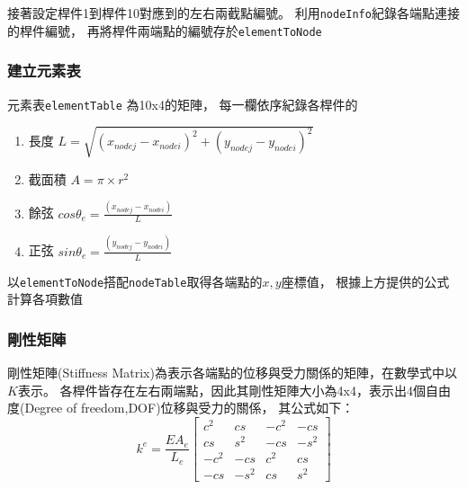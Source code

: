 \documentclass[12pt,a4paper]{article}
\begin{document}
            接著設定桿件1到桿件10對應到的左右兩截點編號。
            利用\texttt{nodeInfo}紀錄各端點連接的桿件編號，
            再將桿件兩端點的編號存於\texttt{elementToNode}
            
            

        \subsubsection{建立元素表}
            
            元素表\texttt{elementTable} 為10x4的矩陣，
            每一欄依序紀錄各桿件的
            \begin{enumerate}
                \item 長度 
                        \begin{math}
                            L=\sqrt{\left(x_{nodej}-x_{nodei}\right)^2+
                                    \left(y_{nodej}-y_{nodei}\right)^2}
                        \end{math}
                \item 截面積 $A=\pi\times r^2$
                \item 餘弦 $cos\theta_e=\displaystyle\frac{\left(x_{nodej}-x_{nodei}\right)}{L}$
                \item 正弦 $sin\theta_e=\displaystyle\frac{\left(y_{nodej}-y_{nodei}\right)}{L}$
            \end{enumerate}

            以\texttt{elementToNode}搭配\texttt{nodeTable}取得各端點的$x,y$座標值，
            根據上方提供的公式計算各項數值
            

        \newpage
        \subsubsection{剛性矩陣}

            剛性矩陣(Stiffness Matrix)為表示各端點的位移與受力關係的矩陣，在數學式中以$K$表示。
            各桿件皆存在左右兩端點，因此其剛性矩陣大小為4x4，表示出4個自由度(Degree of freedom,DOF)位移與受力的關係，
            其公式如下：
            \begin{displaymath}
                k^e = \frac{EA_e}{L_e}\left[
                    \begin{array}{cccc}
                        c^2 & cs & -c^2 & -cs\\
                        cs & s^2 & -cs & -s^2\\
                        -c^2 & -cs & c^2 & cs\\
                        -cs & -s^2 & cs & s^2
                    \end{array}\right]
            \end{displaymath}
\end{document}
